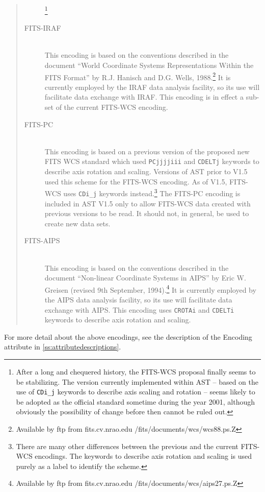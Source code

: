 \documentclass[twoside,11pt]{article}
\newcommand{\appref}[1]{Appendix~\ref{#1}}
\renewcommand{\appref}[1]{\ref{#1}}
\begin{document}
\begin{quote}
\begin{description}
\footnote{After a long and chequered history, the FITS-WCS proposal 
finally seems to be stabilizing. The version currently implemented within
AST -- based on the use of {\tt CDi\_j} keywords to describe axis scaling
and rotation -- seems likely to be adopted as the official standard
sometime during the year 2001, although obviously the possibility of
change before then cannot be ruled out.}

\item[FITS-IRAF]\mbox{}\\
This encoding is based on the conventions described in the document
``World Coordinate Systems Representations Within the FITS Format'' by R.J.
Hanisch and D.G. Wells, 1988.\footnote{Available by ftp from
fits.cv.nrao.edu /fits/documents/wcs/wcs88.ps.Z} It is currently employed
by the IRAF data analysis facility, so its use will facilitate data
exchange with IRAF. This encoding is in effect a sub-set of the current
FITS-WCS encoding.

\item[FITS-PC]\mbox{}\\
This encoding is based on a previous version of the proposed new FITS WCS
standard which used {\tt PCjjjjiii} and {\tt CDELTj} keywords to describe
axis rotation and scaling. Versions of AST prior to V1.5 used this scheme
for the FITS-WCS encoding. As of V1.5, FITS-WCS uses {\tt CDi\_j}
keywords instead.\footnote{There are many other differences between the
previous and the current FITS-WCS encodings. The keywords to describe
axis rotation and scaling is used purely as a label to identify the
scheme.} The FITS-PC encoding is included in AST V1.5 only to allow
FITS-WCS data created with previous versions to be read. It should not,
in general, be used to create new data sets.

\item[FITS-AIPS]\mbox{}\\
This encoding is based on the conventions described in the document
``Non-linear Coordinate Systems in AIPS'' by Eric W. Greisen (revised 9th
September, 1994).\footnote{Available by ftp from fits.cv.nrao.edu
/fits/documents/wcs/aips27.ps.Z} It is currently employed by the AIPS
data analysis facility, so its use will facilitate data exchange with
AIPS. This encoding uses {\tt CROTAi} and {\tt CDELTi} keywords to
describe axis rotation and scaling.
\end{description}
\end{quote}

For more detail about the above encodings, see the description of the
Encoding attribute in \appref{ss:attributedescriptions}.
\end{document}
